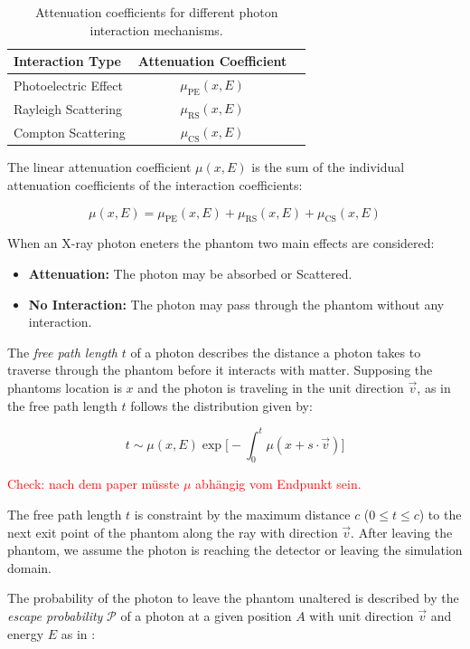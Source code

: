 \begin{table}[H]
    \centering
    \begin{tabular}{lcc}
        \toprule
        \textbf{Interaction Type} & \textbf{Attenuation Coefficient} \\
        \midrule
        Photoelectric Effect & $\mu_{\text{PE}}(x,E)$ \\
        Rayleigh Scattering & $\mu_{\text{RS}}(x,E)$ \\
        Compton Scattering & $\mu_{\text{CS}}(x,E)$ \\
        \bottomrule
    \end{tabular}
    \caption{Attenuation coefficients for different photon interaction mechanisms.}
    \label{tab:attenuation_coefficients}
\end{table}

The linear attenuation coefficient $\mu(x,E)$ is the sum of the individual
attenuation coefficients of the interaction coefficients:

$$\mu(x,E) = \mu_{\text{PE}}(x,E) + \mu_{\text{RS}}(x,E) +
\mu_{\text{CS}}(x,E)$$

When an X-ray photon eneters the phantom two main effects are considered:
\begin{itemize}
    \item \textbf{Attenuation:} The photon may be absorbed or Scattered.
    \item \textbf{No Interaction:} The photon may pass through the phantom
    without any interaction.
\end{itemize}

The \emph{free path length} $t$ of a photon describes the distance a photon takes to traverse through the phantom before it interacts with matter. Supposing the phantoms location is $x$ and the photon is traveling in the unit direction $\vec{v}$, as in \cite{qmcXray2023} the free path length $t$ follows the distribution given by:

$$t \sim \mu(x,E)\exp\bigg[-\int_{0}^{t}{\mu(x+s\cdot\vec{v})}\bigg]$$

\textcolor{red}{Check: nach dem paper müsste $\mu$ abhängig vom Endpunkt sein.}

The free path length $t$ is constraint by the maximum distance $c$ ($0\leq t\leq
c$) to the next exit point of the phantom along the ray with direction
$\vec{v}$. After leaving the phantom, we assume the photon is reaching the
detector or leaving the simulation domain.

The probability of the photon to leave the phantom unaltered is
described by the \emph{escape probability} $\mathcal{P}$ of a photon at a given
position $A$ with unit direction $\vec{v}$ and energy $E$ as in
\cite{qmcXray2023}:

